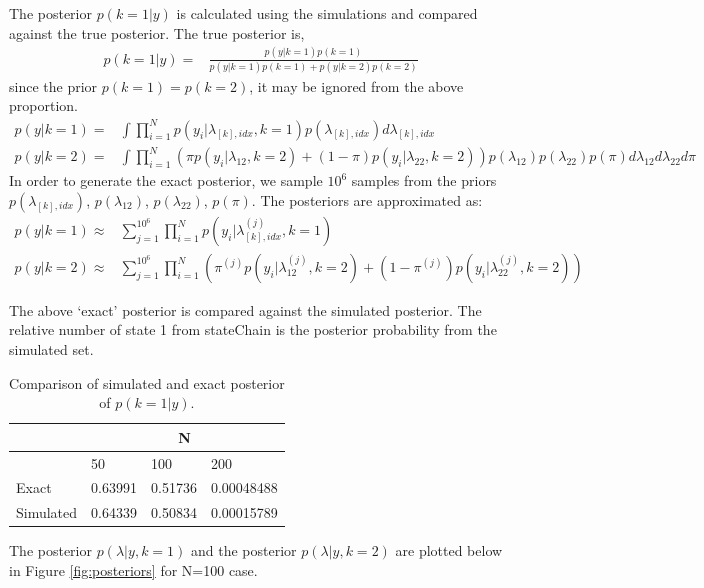 \documentclass{article}
\begin{document}
The posterior $p(k=1|y)$ is calculated using the simulations and compared against the true posterior. The true posterior is,
\begin{align}
p(k=1|y)=&\frac{p(y|k=1)p(k=1)}{p(y|k=1)p(k=1)+p(y|k=2)p(k=2)}
\end{align}
since the prior $p(k=1)=p(k=2)$, it may be ignored from the above proportion.
\begin{align*}
p(y|k=1)=& \int \prod_{i=1}^{N}p(y_i|\lambda_{[k],idx},k=1)p(\lambda_{[k],idx}) d\lambda_{[k],idx}\\
p(y|k=2)=& \int \prod_{i=1}^{N}\left(\pi p(y_i|\lambda_{12},k=2)+(1-\pi)p(y_i|\lambda_{22},k=2)\right)p(\lambda_{12})p(\lambda_{22})p(\pi) d\lambda_{12}d\lambda_{22}d\pi
\end{align*}
In order to generate the exact posterior, we sample $10^6$ samples from the priors $p(\lambda_{[k],idx})$, $p(\lambda_{12})$, $p(\lambda_{22})$, $p(\pi)$. The posteriors are approximated as:
\begin{align}
p(y|k=1)\approx &\sum_{j=1}^{10^6}\prod_{i=1}^{N}p(y_i|\lambda_{[k],idx}^{(j)},k=1)\\
p(y|k=2)\approx & \sum_{j=1}^{10^6} \prod_{i=1}^{N}\left(\pi^{(j)} p(y_i|\lambda_{12}^{(j)},k=2)+(1-\pi^{(j)})p(y_i|\lambda_{22}^{(j)},k=2)\right)
\end{align}

The above `exact' posterior is compared against the simulated posterior. The relative number of state 1 from stateChain is the posterior probability from the simulated set.

\begin{table}[h]
\centering
\begin{tabular}{llll}
\hline
& \multicolumn{3}{c}{N}\\
\hline
& 50 & 100 & 200 \\
\hline
Exact & 0.63991 & 0.51736 & 0.00048488\\
Simulated & 0.64339 & 0.50834 & 0.00015789\\
\hline
\end{tabular}
\caption{Comparison of simulated and exact posterior of $p(k=1|y)$.}
\end{table}

The posterior $p(\lambda|y,k=1)$ and the posterior $p(\lambda|y,k=2)$ are plotted below in Figure \ref{fig:posteriors} for N=100 case.
\end{document}
